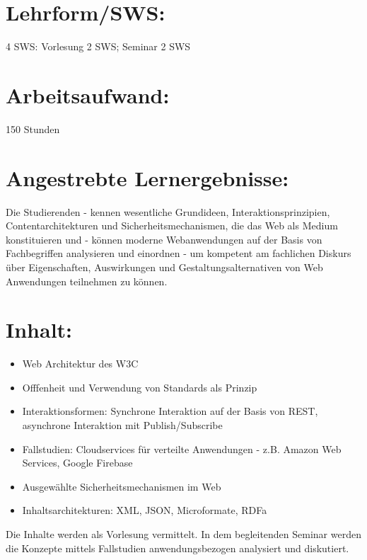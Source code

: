 \section{Lehrform/SWS:}\label{lehrformsws-11}

4 SWS: Vorlesung 2 SWS; Seminar 2 SWS

\section{Arbeitsaufwand:}\label{arbeitsaufwand-11}

150 Stunden

\section{Angestrebte
Lernergebnisse:}\label{angestrebte-lernergebnisse-11}

Die Studierenden - kennen wesentliche Grundideen,
Interaktionsprinzipien, Contentarchitekturen und Sicherheitsmechanismen,
die das Web als Medium konstituieren und - können moderne Webanwendungen
auf der Basis von Fachbegriffen analysieren und einordnen - um kompetent
am fachlichen Diskurs über Eigenschaften, Auswirkungen und
Gestaltungsalternativen von Web Anwendungen teilnehmen zu können.

\section{Inhalt:}\label{inhalt-11}

\begin{itemize}
\tightlist
\item
  Web Architektur des W3C
\item
  Offfenheit und Verwendung von Standards als Prinzip
\item
  Interaktionsformen: Synchrone Interaktion auf der Basis von REST,
  asynchrone Interaktion mit Publish/Subscribe
\item
  Fallstudien: Cloudservices für verteilte Anwendungen - z.B. Amazon Web
  Services, Google Firebase
\item
  Ausgewählte Sicherheitsmechanismen im Web
\item
  Inhaltsarchitekturen: XML, JSON, Microformate, RDFa
\end{itemize}

Die Inhalte werden als Vorlesung vermittelt. In dem begleitenden Seminar
werden die Konzepte mittels Fallstudien anwendungsbezogen analysiert und
diskutiert.

